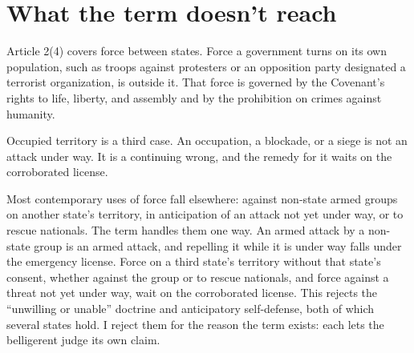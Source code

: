 \section{What the term doesn't reach}
\label{sec:6.6}
Article 2(4) covers force between states. Force a government turns on its own population, such as troops against protesters or an opposition party designated a terrorist organization, is outside it. That force is governed by the Covenant's rights to life, liberty, and assembly and by the prohibition on crimes against humanity.

Occupied territory is a third case.
An occupation, a blockade, or a siege is not an attack under way. It is a continuing wrong, and the remedy for it waits on the corroborated license.

Most contemporary uses of force fall elsewhere: against non-state armed groups on another state's territory, in anticipation of an attack not yet under way, or to rescue nationals. The term handles them one way. An armed attack by a non-state group is an armed attack, and repelling it while it is under way falls under the emergency license. Force on a third state's territory without that state's consent, whether against the group or to rescue nationals, and force against a threat not yet under way, wait on the corroborated license. This rejects the “unwilling or unable” doctrine and anticipatory self-defense, both of which several states hold. I reject them for the reason the term exists: each lets the belligerent judge its own claim.

